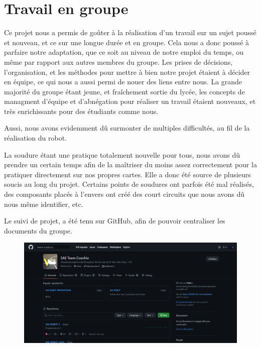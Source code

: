 \section{Travail en groupe}
Ce projet nous a permis de goûter à la réalisation d'un travail sur un sujet poussé et nouveau, et ce sur une longue durée et en groupe. Cela nous a donc poussé à parfaire notre adaptation, que ce soit au niveau de notre emploi du temps, ou même par rapport aux autres membres du groupe. Les prises de décisions, l'organisation, et les méthodes pour mettre à bien notre projet étaient à décider en équipe, ce qui nous a aussi permi de nouer des liens entre nous. La grande majorité du groupe étant jeune, et fraîchement sortie du lycée, les concepts de managment d'équipe et d'abnégation pour réaliser un travail étaient nouveaux, et très enrichissants pour des étudiants comme nous.

Aussi, nous avons evidemment dû surmonter de multiples difficultés, au fil de la réalisation du robot.

La soudure étant une pratique totalement nouvelle pour tous, nous avons dû prendre un certain temps afin de la maîtriser du moins assez correctement pour la pratiquer directement sur nos propres cartes. Elle a donc été source de plusieurs soucis au long du projet. Certains points de soudures ont parfois été mal réalisés, des composants placés à l'envers ont créé des court circuits que nous avons  dû nous même identifier, etc.

Le suivi de projet, a été tenu sur GitHub, afin de pouvoir centraliser les documents du groupe.

\begin{figure}[H]
\centering
\begin{minipage}{.5\textwidth}
  \centering
\href{}{}  \centerline{\includegraphics[width=2\linewidth]{img/sex.png}}
  \label{fig:git}
\end{minipage}%
\end{figure}

